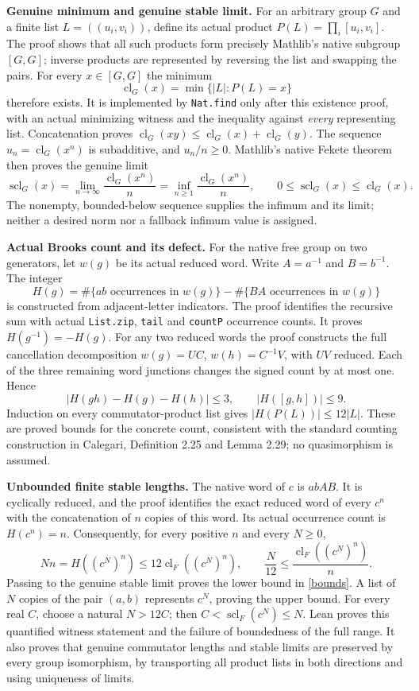 \documentclass[10pt,a4paper]{article}
\newcommand{\scl}{\operatorname{scl}}
\newcommand{\cl}{\operatorname{cl}}
\begin{document}
\textbf{Genuine minimum and genuine stable limit.}
For an arbitrary group $G$ and a finite list $L=((u_i,v_i))$, define its
actual product $P(L)=\prod_i[u_i,v_i]$. The proof shows that all such
products form precisely Mathlib's native subgroup $[G,G]$; inverse
products are represented by reversing the list and swapping the pairs.
For every $x\in[G,G]$ the minimum
\[
  \cl_G(x)=\min\{|L|:P(L)=x\}
\]
therefore exists. It is implemented by \texttt{Nat.find} only after this
existence proof, with an actual minimizing witness and the inequality
against \emph{every} representing list. Concatenation proves
$\cl_G(xy)\le\cl_G(x)+\cl_G(y)$. The sequence
$u_n=\cl_G(x^n)$ is subadditive, and $u_n/n\ge0$. Mathlib's native
Fekete theorem then proves the genuine limit
\[
 \scl_G(x)=\lim_{n\to\infty}\frac{\cl_G(x^n)}n
 =\inf_{n\ge1}\frac{\cl_G(x^n)}n,
 \qquad 0\le\scl_G(x)\le\cl_G(x).
\]
The nonempty, bounded-below sequence supplies the infimum and its limit;
neither a desired norm nor a fallback infimum value is assigned.

\textbf{Actual Brooks count and its defect.}
For the native free group on two generators, let $w(g)$ be its actual
reduced word. Write $A=a^{-1}$ and $B=b^{-1}$. The integer
\[
 H(g)=\#\{ab\text{ occurrences in }w(g)\}
       -\#\{BA\text{ occurrences in }w(g)\}
\]
is constructed from adjacent-letter indicators. The proof identifies
the recursive sum with actual \texttt{List.zip}, \texttt{tail} and
\texttt{countP} occurrence counts. It proves $H(g^{-1})=-H(g)$.
For any two reduced words the proof constructs the full cancellation
decomposition $w(g)=UC$, $w(h)=C^{-1}V$, with $UV$ reduced. Each of
the three remaining word junctions changes the signed count by at most
one. Hence
\[
 |H(gh)-H(g)-H(h)|\le3,\qquad |H([g,h])|\le9.
\]
Induction on every commutator-product list gives
$|H(P(L))|\le12|L|$. These are proved bounds for the concrete count,
consistent with the standard counting construction in Calegari,
Definition 2.25 and Lemma 2.29; no quasimorphism is assumed.

\textbf{Unbounded finite stable lengths.}
The native word of $c$ is $abAB$. It is cyclically reduced, and the proof
identifies the exact reduced word of every $c^n$ with the concatenation
of $n$ copies of this word. Its actual occurrence count is $H(c^n)=n$.
Consequently, for every positive $n$ and every $N\ge0$,
\[
 Nn=H((c^N)^n)\le12\cl_F((c^N)^n),\qquad
 \frac{N}{12}\le\frac{\cl_F((c^N)^n)}n.
\]
Passing to the genuine stable limit proves the lower bound in
\eqref{bounds}. A list of $N$ copies of the pair $(a,b)$ represents
$c^N$, proving the upper bound. For every real $C$, choose a natural
$N>12C$; then $C<\scl_F(c^N)\le N$. Lean proves this quantified
witness statement and the failure of boundedness of the full range.
It also proves that genuine commutator lengths and stable limits are
preserved by every group isomorphism, by transporting all product lists
in both directions and using uniqueness of limits.
\end{document}
